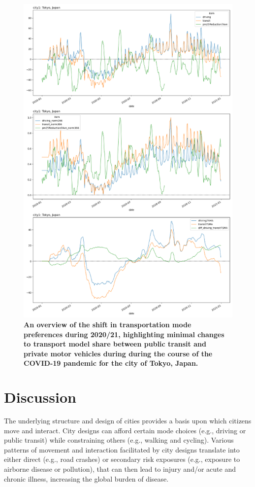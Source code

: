 \documentclass[preprint,12pt]{elsarticle}
\begin{document}
\begin{figure}
\centering
\includegraphics[trim={0 455 0 0},clip,scale=0.9]{Images/TokyoTransit_Driving.png}
\caption{\bf An overview of the shift in transportation mode preferences during 2020/21, highlighting minimal changes to transport model share between public transit and private motor vehicles during during the course of the COVID-19 pandemic for the city of Tokyo, Japan.}  
 \label{fig:TokyoDriv_trans}
\end{figure}


\section*{Discussion}
The underlying structure and design of cities provides a basis upon which citizens move and interact. City designs can afford certain mode choices (e.g., driving or public transit) while constraining others (e.g., walking and cycling). Various patterns of movement and interaction facilitated by city designs translate into either direct (e.g., road crashes) or secondary risk exposures (e.g., exposure to airborne disease or pollution), that can then lead to injury and/or acute and chronic illness, increasing the global burden of disease.
\end{document}
